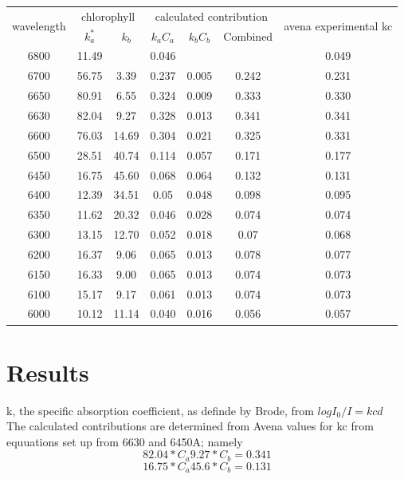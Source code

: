 \documentclass[a4paper, 11pt]{article}
\begin{document}
	\restoregeometry
	\begin{longtable}{|c|c|c|c|c|c|c|}
		\hline
		\multirow{2}{*}{wavelength} & 
		\multicolumn{2}{c}{chlorophyll} & 
		\multicolumn{3}{c}{calculated contribution} & 
		\multirow{2}{*}{avena experimental kc} \\
		& $k_a^*$ & $k_b$ & $k_aC_a$ & $k_bC_b$ & Combined & \\ \hline
		6800 & 11.49 &&0.046 &&&0.049 \\
		6700 & 56.75 & 3.39 & 0.237 & 0.005 & 0.242 & 0.231\\
		6650 & 80.91 & 6.55 & 0.324 & 0.009 & 0.333 & 0.330\\
		6630 & 82.04 & 9.27 & 0.328 & 0.013 & 0.341 & 0.341\\
		6600 & 76.03 & 14.69 & 0.304 & 0.021 & 0.325 & 0.331\\
		6500 & 28.51 & 40.74 & 0.114 & 0.057 & 0.171 &0.177\\
		6450 & 16.75 & 45.60 & 0.068 & 0.064 & 0.132 & 0.131\\
		6400 & 12.39 & 34.51 &0.05 & 0.048 & 0.098 & 0.095\\
		6350 & 11.62 & 20.32 & 0.046 & 0.028 & 0.074 & 0.074\\
		6300 & 13.15 & 12.70 & 0.052 & 0.018 & 0.07 &0.068\\
		6200 & 16.37 & 9.06 & 0.065 & 0.013 &0.078 & 0.077\\
		6150 & 16.33 &9.00 &0.065 & 0.013 & 0.074 & 0.073\\
		6100 & 15.17 & 9.17 & 0.061 & 0.013 & 0.074 & 0.073\\
		6000 & 10.12 & 11.14 & 0.040 & 0.016 & 0.056 & 0.057\\\hline
	\end{longtable}
	\cite{Mackinney}
	
	\twocolumn
\section{Results}
	k, the specific absorption coefficient, as definde by Brode, from $logI_0/I=kcd$\\
	
	The calculated contributions are determined from Avena values for kc from equuations set up from 6630 and 6450A; namely
	\begin{equation}
	82.04*C_a9.27*C_b=0.341
	\end{equation}
	\begin{equation}
	16.75*C_a45.6*C_b=0.131
	\end{equation}
	\cite{Mackinney}
	
\end{document}
